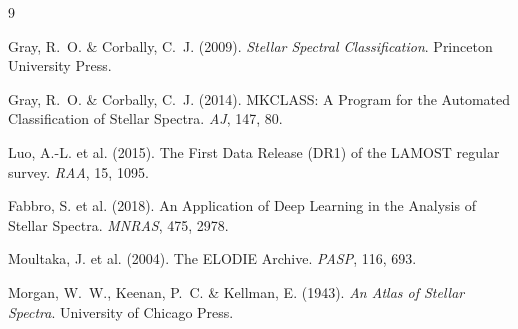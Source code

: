 \documentclass[12pt,a4paper]{article}
\begin{document}

\begin{thebibliography}{9}

  Gray, R.~O. \& Corbally, C.~J. (2009).
  \textit{Stellar Spectral Classification}.
  Princeton University Press.

  Gray, R.~O. \& Corbally, C.~J. (2014).
  MKCLASS: A Program for the Automated Classification of Stellar Spectra.
  \textit{AJ}, 147, 80.

  Luo, A.-L. et al. (2015).
  The First Data Release (DR1) of the LAMOST regular survey.
  \textit{RAA}, 15, 1095.

  Fabbro, S. et al. (2018).
  An Application of Deep Learning in the Analysis of Stellar Spectra.
  \textit{MNRAS}, 475, 2978.

  Moultaka, J. et al. (2004).
  The ELODIE Archive.
  \textit{PASP}, 116, 693.

  Morgan, W.~W., Keenan, P.~C. \& Kellman, E. (1943).
  \textit{An Atlas of Stellar Spectra}.
  University of Chicago Press.

\end{thebibliography}
\end{document}
